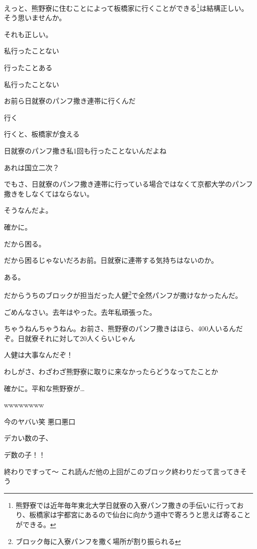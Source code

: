 \begin{multicols}{3}
えっと、熊野寮に住むことによって板橋家に行くことができる\footnote{熊野寮では近年毎年東北大学日就寮の入寮パンフ撒きの手伝いに行っており、板橋家は宇都宮にあるので仙台に向かう道中で寄ろうと思えば寄ることができる。}は結構正しい。そう思いませんか。

それも正しい。

私行ったことない

行ったことある

私行ったことない

お前ら日就寮のパンフ撒き連帯に行くんだ

行く

行くと、板橋家が食える

日就寮のパンフ撒き私1回も行ったことないんだよね

あれは国立二次？

でもさ、日就寮のパンフ撒き連帯に行っている場合ではなくて京都大学のパンフ撒きをしなくてはならない。

そうなんだよ。

確かに。

だから困る。

だから困るじゃないだろお前。日就寮に連帯する気持ちはないのか。

ある。

だからうちのブロックが担当だった人健\footnote{ブロック毎に入寮パンフを撒く場所が割り振られる}で全然パンフが撒けなかったんだ。

ごめんなさい。去年はやった。去年私頑張った。

ちゃうねんちゃうねん。お前さ、熊野寮のパンフ撒きはほら、400人いるんだぞ。日就寮それに対して20人くらいじゃん

人健は大事なんだぞ！

わしがさ、わざわざ熊野寮に取りに来なかったらどうなってたことか

確かに。平和な熊野寮が…

wwwwwwww

今のヤバい笑 悪口悪口

デカい数の子、

デ数の子！！

終わりですって～ これ読んだ他の上回がこのブロック終わりだって言ってきそう


\end{multicols}
